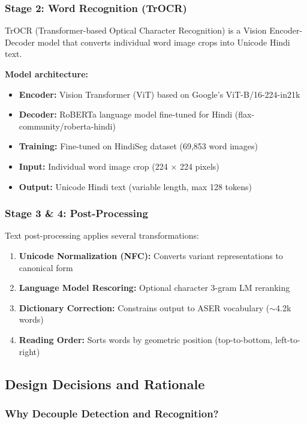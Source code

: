 \documentclass[14pt,a4paper]{article}
\begin{document}
\subsubsection{Stage 2: Word Recognition (TrOCR)}

TrOCR (Transformer-based Optical Character Recognition) is a Vision Encoder-Decoder model that converts individual word image crops into Unicode Hindi text.

\textbf{Model architecture:}
\begin{itemize}
    \item \textbf{Encoder:} Vision Transformer (ViT) based on Google's ViT-B/16-224-in21k
    \item \textbf{Decoder:} RoBERTa language model fine-tuned for Hindi (flax-community/roberta-hindi)
    \item \textbf{Training:} Fine-tuned on HindiSeg dataset (69,853 word images)
    \item \textbf{Input:} Individual word image crop (224 × 224 pixels)
    \item \textbf{Output:} Unicode Hindi text (variable length, max 128 tokens)
\end{itemize}

\subsubsection{Stage 3 \& 4: Post-Processing}

Text post-processing applies several transformations:
\begin{enumerate}
    \item \textbf{Unicode Normalization (NFC):} Converts variant representations to canonical form
    \item \textbf{Language Model Rescoring:} Optional character 3-gram LM reranking
    \item \textbf{Dictionary Correction:} Constrains output to ASER vocabulary ($\sim$4.2k words)
    \item \textbf{Reading Order:} Sorts words by geometric position (top-to-bottom, left-to-right)
\end{enumerate}

\subsection{Design Decisions and Rationale}

\subsubsection{Why Decouple Detection and Recognition?}
\end{document}
